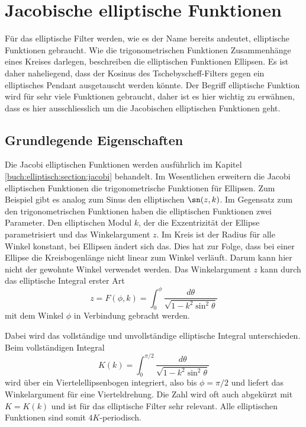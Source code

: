\section{Jacobische elliptische Funktionen}

Für das elliptische Filter werden, wie es der Name bereits andeutet, elliptische Funktionen gebraucht.
Wie die trigonometrischen Funktionen Zusammenhänge eines Kreises darlegen, beschreiben die elliptischen Funktionen Ellipsen.
Es ist daher naheliegend, dass der Kosinus des Tschebyscheff-Filters gegen ein elliptisches Pendant ausgetauscht werden könnte.
Der Begriff elliptische Funktion wird für sehr viele Funktionen gebraucht, daher ist es hier wichtig zu erwähnen, dass es hier ausschliesslich um die Jacobischen elliptischen Funktionen geht.
%

\subsection{Grundlegende Eigenschaften}

Die Jacobi elliptischen Funktionen werden ausführlich im Kapitel \ref{buch:elliptisch:section:jacobi} behandelt.
Im Wesentlichen erweitern die Jacobi elliptischen Funktionen die trigonometrische Funktionen für Ellipsen.
Zum Beispiel gibt es analog zum Sinus den elliptischen $\sn(z, k)$.
Im Gegensatz zum den trigonometrischen Funktionen haben die elliptischen Funktionen zwei Parameter.
Den elliptischen Modul $k$, der die Exzentrizität der Ellipse parametrisiert und das Winkelargument $z$.
%
%
Im Kreis ist der Radius für alle Winkel konstant, bei Ellipsen ändert sich das.
Dies hat zur Folge, dass bei einer Ellipse die Kreisbogenlänge nicht linear zum Winkel verläuft.
Darum kann hier nicht der gewohnte Winkel verwendet werden.
Das Winkelargument $z$ kann durch das elliptische Integral erster Art
\begin{equation}
    z
    =
    F(\phi, k)
    =
    \int_{0}^{\phi}
    \frac{
        d\theta
    }{
        \sqrt{
            1-k^2 \sin^2 \theta
        }
    }
\end{equation}
mit dem Winkel $\phi$ in Verbindung gebracht werden.

Dabei wird das vollständige und unvollständige elliptische Integral unterschieden.
Beim vollständigen Integral
\begin{equation}
    K(k)
    =
    \int_{0}^{\pi / 2}
    \frac{
        d\theta
    }{
        \sqrt{
            1-k^2 \sin^2 \theta
        }
    }
\end{equation}
wird über ein Viertelellipsenbogen integriert, also bis $\phi=\pi/2$ und liefert das Winkelargument für eine Vierteldrehung.
Die Zahl wird oft auch abgekürzt mit $K = K(k)$ und ist für das elliptische Filter sehr relevant.
Alle elliptischen Funktionen sind somit $4K$-periodisch.

